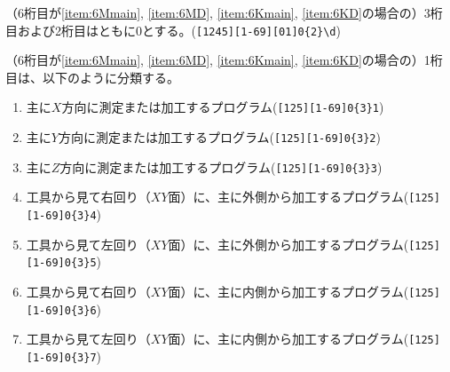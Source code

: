 （6桁目が\ref{item:6Mmain}, \ref{item:6MD}, \ref{item:6Kmain}, \ref{item:6KD}\hx の場合の）3桁目および2桁目はともに0とする。(\verb|[1245][1-69][01]0{2}\d|)



（6桁目が\ref{item:6Mmain}, \ref{item:6MD}, \ref{item:6Kmain}, \ref{item:6KD}\hx の場合の）1桁目は、以下のように分類する。
\begin{enumerate}[label=\arabic*.]
\item 主に$X$方向に測定または加工するプログラム(\verb|[125][1-69]0{3}1|)
\item 主に$Y$方向に測定または加工するプログラム(\verb|[125][1-69]0{3}2|)
\item 主に$Z$方向に測定または加工するプログラム(\verb|[125][1-69]0{3}3|)
\item 工具から見て右回り（$XY$面）に、主に外側から加工するプログラム(\verb|[125][1-69]0{3}4|)
\item 工具から見て左回り（$XY$面）に、主に外側から加工するプログラム(\verb|[125][1-69]0{3}5|)
\item 工具から見て右回り（$XY$面）に、主に内側から加工するプログラム(\verb|[125][1-69]0{3}6|)
\item 工具から見て左回り（$XY$面）に、主に内側から加工するプログラム(\verb|[125][1-69]0{3}7|)
\end{enumerate}
